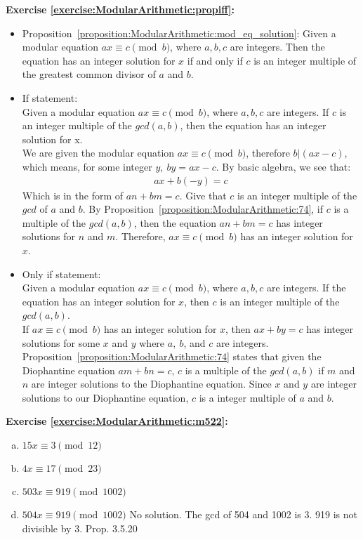 \noindent\textbf{Exercise \ref{exercise:ModularArithmetic:propiff}:} %
\begin{itemize}
\item
Proposition~\ref{proposition:ModularArithmetic:mod_eq_solution}: Given a modular equation $ax\equiv c \pmod{b}$, where $a,b,c$ are integers. Then the equation has an integer solution for $x$ if and only if $c$ is an integer multiple of the greatest common divisor of $a$ and $b$.
        
\item 
If statement:\\
Given a modular equation $ax\equiv c \pmod{b}$, where $a,b,c$ are integers. If $c$ is an integer multiple of the $gcd(a,b)$, then the equation has an integer solution for x.\\
We are given the modular equation $ax\equiv c \pmod{b}$, therefore $b|(ax-c)$, which means, for some integer $y,\ by = ax - c$. By basic algebra, we see that:
\begin{align*}
ax + b(-y) = c 
\end{align*}
Which is in the form of $an + bm = c$. Give that $c$ is an integer multiple of the $gcd$ of $a$ and $b$. By Proposition~\ref{proposition:ModularArithmetic:74}, if $c$ is a multiple of the $gcd(a,b)$, then the equation $an + bm = c$ has integer solutions for $n$ and $m$. Therefore, $ax\equiv c \pmod{b}$ has an integer solution for $x$.
        
\item 
Only if statement:\\
Given a modular equation $ax\equiv c \pmod{b}$, where $a, b, c$ are integers. If the equation has an integer solution for $x$, then $c$ is an integer multiple of the $gcd(a,b)$.\\
        
If $ax\equiv c \pmod{b}$ has an integer solution for $x$, then $ax + by = c$ has integer solutions for some $x$ and $y$ where $a,\ b$, and $c$ are integers. Proposition~\ref{proposition:ModularArithmetic:74} states that given the Diophantine equation $am + bn = c$, $c$ is a multiple of the $gcd(a,b)$ if $m$ and $n$ are integer solutions to the Diophantine equation. Since $x$ and $y$ are integer solutions to our Diophantine equation, $c$ is a integer multiple of $a$ and $b$.
\end{itemize}


\noindent\textbf{Exercise \ref{exercise:ModularArithmetic:m522}:}%
\begin{enumerate}[(a)]
\item
$15x \equiv 3 \pmod{12}$
\item
$4x \equiv 17 \pmod{23}$
\item
$503x \equiv 919 \pmod{1002}$
\item
$504x \equiv 919 \pmod{1002}$
No solution. The gcd of 504 and 1002 is 3. 919 is not divisible by 3. Prop. 3.5.20
\end{enumerate}

